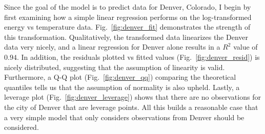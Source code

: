 \documentclass[11pt]{article}
\begin{document}
Since the goal of the model is to predict data for Denver, Colorado, I begin by first examining how a simple linear regression performs on the log-transformed energy vs temperature data. Fig.~\ref{fig:denver_fit} demonstrates the strength of this transformation. Qualitatively, the transformed data linearizes the Denver data very nicely, and a linear regression for Denver alone results in a $R^2$ value of $0.94$. In addition, the residuals plotted vs fitted values (Fig.~\ref{fig:denver_resid}) is nicely distributed, suggesting that the assumption of linearity is valid. Furthermore, a Q-Q plot (Fig.~\ref{fig:denver_qq}) comparing the theoretical quantiles tells us that the assumption of normality is also upheld. Lastly, a leverage plot (Fig.~\ref{fig:denver_leverage}) shows that there are no observations for the city of Denver that are leverage points. All this builds a reasonable case that a very simple model that only considers observations from Denver should be considered.
\end{document}
